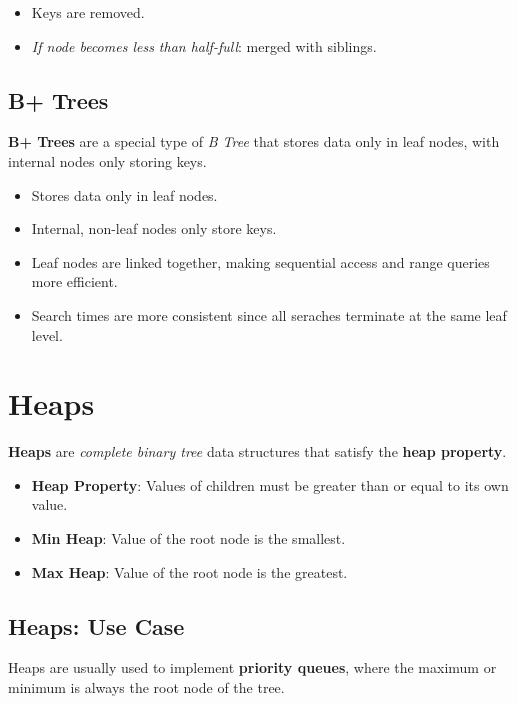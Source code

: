 \documentclass[12pt, letterpaper]{article}
\begin{document}
\begin{itemize}
    \item Keys are removed.
    \item \textit{If node becomes less than half-full}: merged with siblings.
\end{itemize}

\subsection*{B+ Trees}

\textbf{B+ Trees} are a special type of \textit{B Tree} that stores data only in leaf nodes, with internal nodes only storing keys.

\begin{itemize}
    \item Stores data only in leaf nodes.
    \item Internal, non-leaf nodes only store keys.
    \item Leaf nodes are linked together, making sequential access and range queries more efficient.
    \item Search times are more consistent since all seraches terminate at the same leaf level.
\end{itemize}

\section*{Heaps}

\textbf{Heaps} are \textit{complete binary tree} data structures that satisfy the \textbf{heap property}.

\begin{itemize}
    \item \textbf{Heap Property}: Values of children must be greater than or equal to its own value.
    \item \textbf{Min Heap}: Value of the root node is the smallest.
    \item \textbf{Max Heap}: Value of the root node is the greatest.
\end{itemize}

\subsection*{Heaps: Use Case}

Heaps are usually used to implement \textbf{priority queues}, where the maximum or minimum is always the root node of the tree.
\medskip
\end{document}
